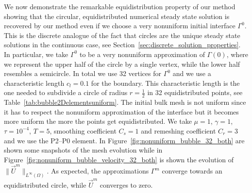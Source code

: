 \documentclass[a4paper,12pt,onecolumn]{article}
\begin{document}
We now demonstrate the remarkable equidistribution property of our method
showing that the circular, equidistributed numerical steady state solution is
recovered by our method even if we choose a very nonuniform initial interface
$\Gamma^0$. This is the discrete analogue of the fact that circles are the
unique steady state solutions in the continuous case, see
Section~\ref{sec:discrete_solution_properties}. In particular, we take
$\Gamma^0$ to be a very nonuniform approximation of $\Gamma(0)$, where we
represent the upper half of the circle by a single vertex, while the lower half
resembles a semicircle. In total we use 32 vertices for $\Gamma^0$ and we use a
characteristic length $c_l=0.1$ for the boundary. This characteristic length is
the one needed to subdivide a circle of radius $r=\frac{1}{2}$ in 32
equidistributed points, see Table~\ref{tab:bubble2Delementsuniform}. The initial
bulk mesh is not uniform since it has to respect the nonuniform approximation of
the interface but it becomes more uniform the more the points get
equidistributed. We take $\mu=1$, $\gamma=1$, $\tau=10^{-4}$, $T=5$, smoothing
coefficient $C_s=1$ and remeshing coefficient $C_r=3$ and we use the P2--P0
element. In Figure~\ref{fig:nonuniform_bubble_32_both} are shown some snapshots
of the mesh evolution while in
Figure~\ref{fig:nonuniform_bubble_velocity_32_both} is shown the evolution of
$\|\vec U^m\|_{L^\infty(\Omega)}$. As expected, the approximations $\Gamma^m$
converge towards an equidistributed circle, while $\vec U^m$ converges to zero.
\end{document}
